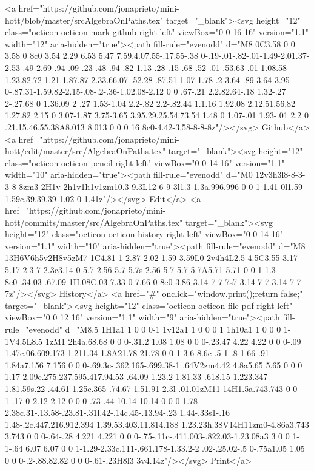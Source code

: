       <a href="https://github.com/jonaprieto/mini-hott/blob/master/srcAlgebraOnPaths.tex" target="_blank"><svg height="12" class="octicon octicon-mark-github right left" viewBox="0 0 16 16" version="1.1" width="12" aria-hidden="true"><path fill-rule="evenodd" d="M8 0C3.58 0 0 3.58 0 8c0 3.54 2.29 6.53 5.47 7.59.4.07.55-.17.55-.38 0-.19-.01-.82-.01-1.49-2.01.37-2.53-.49-2.69-.94-.09-.23-.48-.94-.82-1.13-.28-.15-.68-.52-.01-.53.63-.01 1.08.58 1.23.82.72 1.21 1.87.87 2.33.66.07-.52.28-.87.51-1.07-1.78-.2-3.64-.89-3.64-3.95 0-.87.31-1.59.82-2.15-.08-.2-.36-1.02.08-2.12 0 0 .67-.21 2.2.82.64-.18 1.32-.27 2-.27.68 0 1.36.09 2 .27 1.53-1.04 2.2-.82 2.2-.82.44 1.1.16 1.92.08 2.12.51.56.82 1.27.82 2.15 0 3.07-1.87 3.75-3.65 3.95.29.25.54.73.54 1.48 0 1.07-.01 1.93-.01 2.2 0 .21.15.46.55.38A8.013 8.013 0 0 0 16 8c0-4.42-3.58-8-8-8z"/></svg> Github</a>
      <a href="https://github.com/jonaprieto/mini-hott/edit/master/src/AlgebraOnPaths.tex" target="_blank"><svg height="12" class="octicon octicon-pencil right left" viewBox="0 0 14 16" version="1.1" width="10" aria-hidden="true"><path fill-rule="evenodd" d="M0 12v3h3l8-8-3-3-8 8zm3 2H1v-2h1v1h1v1zm10.3-9.3L12 6 9 3l1.3-1.3a.996.996 0 0 1 1.41 0l1.59 1.59c.39.39.39 1.02 0 1.41z"/></svg> Edit</a>
      <a href="https://github.com/jonaprieto/mini-hott/commits/master/src/AlgebraOnPaths.tex" target="_blank"><svg height="12" class="octicon octicon-history right left" viewBox="0 0 14 16" version="1.1" width="10" aria-hidden="true"><path fill-rule="evenodd" d="M8 13H6V6h5v2H8v5zM7 1C4.81 1 2.87 2.02 1.59 3.59L0 2v4h4L2.5 4.5C3.55 3.17 5.17 2.3 7 2.3c3.14 0 5.7 2.56 5.7 5.7s-2.56 5.7-5.7 5.7A5.71 5.71 0 0 1 1.3 8c0-.34.03-.67.09-1H.08C.03 7.33 0 7.66 0 8c0 3.86 3.14 7 7 7s7-3.14 7-7-3.14-7-7-7z"/></svg> History</a>
      <a  href="#" onclick="window.print();return false;" target="_blank"><svg height="12" class="octicon octicon-file-pdf right left" viewBox="0 0 12 16" version="1.1" width="9" aria-hidden="true"><path fill-rule="evenodd" d="M8.5 1H1a1 1 0 0 0-1 1v12a1 1 0 0 0 1 1h10a1 1 0 0 0 1-1V4.5L8.5 1zM1 2h4a.68.68 0 0 0-.31.2 1.08 1.08 0 0 0-.23.47 4.22 4.22 0 0 0-.09 1.47c.06.609.173 1.211.34 1.8A21.78 21.78 0 0 1 3.6 8.6c-.5 1-.8 1.66-.91 1.84a7.156 7.156 0 0 0-.69.3c-.362.165-.699.38-1 .64V2zm4.42 4.8a5.65 5.65 0 0 0 1.17 2.09c.275.237.595.417.94.53-.64.09-1.23.2-1.81.33-.618.15-1.223.347-1.81.59s.22-.44.61-1.25c.365-.74.67-1.51.91-2.3l-.01.01zM11 14H1.5a.743.743 0 0 1-.17 0 2.12 2.12 0 0 0 .73-.44 10.14 10.14 0 0 0 1.78-2.38c.31-.13.58-.23.81-.31l.42-.14c.45-.13.94-.23 1.44-.33s1-.16 1.48-.2c.447.216.912.394 1.39.53.403.11.814.188 1.23.23h.38V14H11zm0-4.86a3.743 3.743 0 0 0-.64-.28 4.221 4.221 0 0 0-.75-.11c-.411.003-.822.03-1.23.08a3 3 0 0 1-1-.64 6.07 6.07 0 0 1-1.29-2.33c.111-.661.178-1.33.2-2 .02-.25.02-.5 0-.75a1.05 1.05 0 0 0-.2-.88.82.82 0 0 0-.61-.23H8l3 3v4.14z"/></svg> Print</a>
